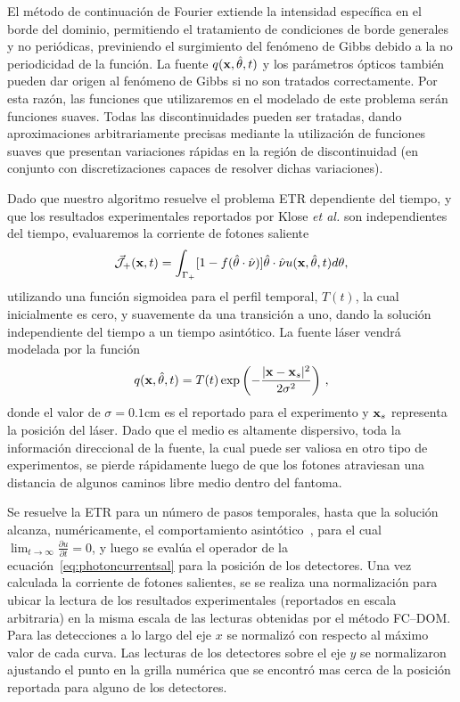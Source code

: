 El método de continuación de Fourier extiende 
la intensidad específica en el borde del dominio, 
permitiendo el tratamiento de condiciones de borde generales y no periódicas, 
previniendo el surgimiento del fenómeno de Gibbs debido a la no periodicidad 
de la función. La fuente $q(\mathbf{x},\hat{\theta},t)$ y los parámetros ópticos 
también pueden dar origen al fenómeno de Gibbs si no son 
tratados correctamente. Por esta razón, las funciones que utilizaremos 
en el modelado de este problema serán funciones suaves. Todas las discontinuidades pueden
ser tratadas, dando aproximaciones arbitrariamente precisas 
mediante la utilización de funciones suaves que presentan 
variaciones rápidas en la región de discontinuidad (en conjunto 
con discretizaciones capaces de resolver dichas variaciones).

Dado que nuestro algoritmo resuelve el problema ETR dependiente del tiempo, 
y que los resultados experimentales reportados por Klose \textit{et al.} 
son independientes del tiempo, evaluaremos la corriente de fotones saliente 
\begin{equation}
 \vec{ \mathcal{J}}_+(\mathbf{x},t)=\int_{\Gamma_+} [1-f(\hat{\theta} \cdot \hat{\nu})] \hat{\theta} \cdot \hat{\nu} u(\mathbf{x},\hat{\theta},t) d\theta,
\label{eq:photoncurrentsal}
\end{equation}
utilizando una función sigmoidea para el perfil temporal, $T(t)$,
la cual inicialmente es cero, y suavemente da una transición 
a uno, dando la solución independiente del tiempo a un tiempo asintótico. 
La fuente láser vendrá modelada por la función
\begin{equation}
q(\mathbf{x},\hat{\theta},t)=T(t)\exp \left(  -\frac{|\mathbf{x}-\mathbf{x}_s|^2}{2\sigma^2} \right)  \, ,
\label{eq:sourceGauss}
\end{equation}
donde el valor de $\sigma=0.1$cm es el reportado para el experimento y $\mathbf{x}_s$ 
representa la posición del láser. 
Dado que el medio es altamente dispersivo, toda la información 
direccional de la fuente, la cual 
puede ser valiosa en otro tipo de experimentos, se pierde rápidamente luego de que los fotones 
atraviesan una distancia de algunos caminos libre medio dentro del fantoma. 

Se resuelve la ETR para un número de pasos temporales, 
hasta que la solución alcanza, numéricamente, el comportamiento 
asintótico~\cite{Bruno2010}, para el cual $\lim_{t\to \infty} \frac{\partial u}{\partial t}=0$, 
y luego se evalúa el operador de la ecuación~\eqref{eq:photoncurrentsal} 
para la posición de los detectores.
Una vez  calculada la corriente de fotones salientes, se
se realiza una normalización para ubicar la lectura 
de los resultados experimentales (reportados en escala arbitraria) 
en la misma escala de las lecturas obtenidas por el método FC--DOM. 
Para las detecciones a lo largo del eje $x$ se normalizó 
con respecto al máximo valor de cada curva. 
 Las lecturas de los detectores sobre el eje $y$ 
 se normalizaron ajustando el punto en la grilla numérica 
 que se encontró mas cerca de la posición reportada 
 para alguno de los detectores. 
 
